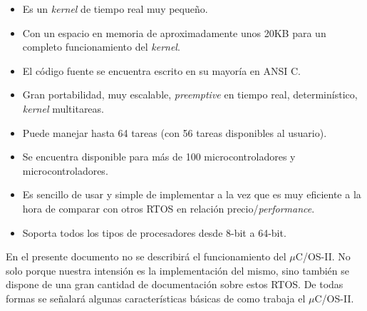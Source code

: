 \documentclass[11pt,a4paper,oneside]{article}
\def\uCOS{$\mu$C/OS-II\texttrademark}
\begin{document}
\begin{itemize}
\item Es un \textsl{kernel} de tiempo real muy pequeño.
\item Con un espacio en memoria de aproximadamente unos 20KB para un completo funcionamiento del \textsl{kernel}. 
\item El código fuente se encuentra escrito en su mayoría en ANSI C.
\item Gran portabilidad, muy escalable, \textsl{preemptive} en tiempo real, determinístico, \textsl{kernel} multitareas.
\item Puede manejar hasta 64 tareas (con 56 tareas disponibles al usuario).
\item Se encuentra disponible para más de 100 microcontroladores y microcontroladores.
\item Es sencillo de usar y simple de implementar a la vez que es muy eficiente a la hora de comparar con otros RTOS en relación precio/\textsl{performance}.
\item Soporta todos los tipos de procesadores desde 8-bit a 64-bit.
\end{itemize}

En el presente documento no se describirá el funcionamiento del \uCOS. No solo porque nuestra intensión es la implementación del mismo, sino también se dispone de una gran cantidad de documentación sobre estos RTOS. De todas formas se señalará algunas características básicas de como trabaja el \uCOS. 
\end{document}

